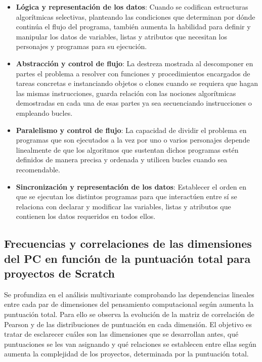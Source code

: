 \documentclass[a4paper, 12pt]{book}
\begin{document}
\begin{itemize}
    \item \textbf{Lógica y representación de los datos}: Cuando se codifican estructuras algorítmicas selectivas, planteando las condiciones que determinan por dónde continúa el flujo del programa, también aumenta la habilidad para definir y manipular los datos de variables, listas y atributos que necesitan los personajes y programas para su ejecución.
    \item \textbf{Abstracción y control de flujo}: La destreza mostrada al descomponer en partes el problema a resolver con funciones y procedimientos encargados de tareas concretas e instanciando objetos o clones cuando se requiera que hagan las mismas instrucciones, guarda relación con las nociones algorítmicas demostradas en cada una de esas partes ya sea secuenciando instrucciones o empleando bucles. %
    \item \textbf{Paralelismo y control de flujo}: La capacidad de dividir el problema en programas que son ejecutados a la vez por uno o varios personajes depende linealmente de que los algoritmos que sustentan dichos programas estén definidos de manera precisa y ordenada y utilicen bucles cuando sea recomendable.
    \item \textbf{Sincronización y representación de los datos}: Establecer el orden en que se ejecutan los distintos programas para que interactúen entre sí se relaciona con declarar y modificar las variables, listas y atributos que contienen los datos requeridos en todos ellos.
\end{itemize}


\subsection{Frecuencias y correlaciones de las dimensiones del PC en función de la puntuación total para proyectos de Scratch}
\label{subsec:corr_21_Scratch}

Se profundiza en el análisis multivariante comprobando las dependencias lineales entre cada par de dimensiones del pensamiento computacional según aumenta la puntuación total. Para ello se observa la evolución de la matriz de correlación de Pearson y de las distribuciones de puntuación en cada dimensión. El objetivo es tratar de esclarecer cuáles son las dimensiones que se desarrollan antes, qué puntuaciones se les van asignando y qué relaciones se establecen entre ellas según aumenta la complejidad de los proyectos, determinada por la puntuación total.
\end{document}
